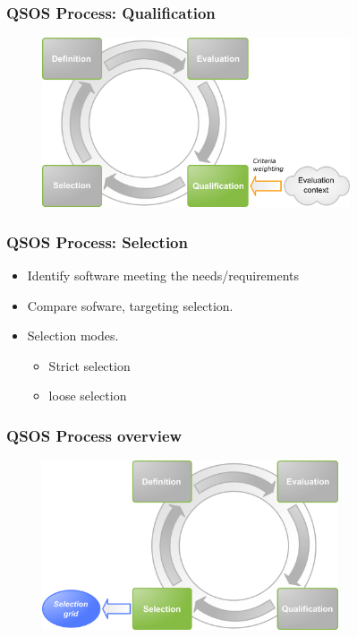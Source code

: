 \documentclass{beamer}
\begin{document}
\begin{frame}
\frametitle{QSOS Process: Qualification}
\begin{center}
\begin{figure}
 \includegraphics[height=5cm]{figs/QSOS_Process_Qualification.png}
\end{figure}
\end{center}
\end{frame}


\begin{frame}
 \frametitle{QSOS Process: Selection}
 \begin{itemize}
 \item Identify software meeting the needs/requirements
 \item Compare sofware, targeting selection.
 \item Selection modes.
    \begin{itemize}
     \item Strict selection
     \item loose selection
    \end{itemize}

 \end{itemize}
\end{frame}


\begin{frame}
\frametitle{QSOS Process overview}
\begin{center}
\begin{figure}
 \includegraphics[height=5cm]{figs/QSOS_Process_Selection.png}
\end{figure}
\end{center}
\end{frame}
\end{document}
